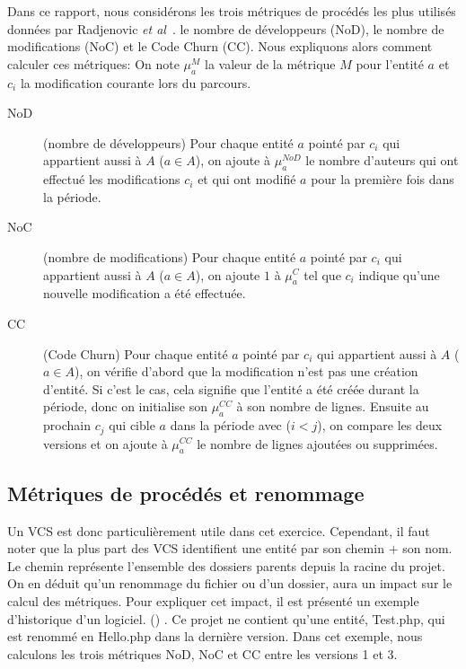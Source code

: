 Dans ce rapport, nous considérons les trois métriques de procédés les plus utilisés données par Radjenovic \emph{et al}~\cite{radjenovic_software_2013}. le nombre de développeurs (NoD), le nombre de modifications (NoC) et le Code Churn (CC). Nous expliquons alors comment calculer ces métriques:
On note $\mu_{a}^{M}$ la valeur de la métrique $M$ pour l'entité $a$ et  $c_i$ la modification courante lors du parcours. 
\begin{description}
	\item[NoD] (nombre de développeurs) Pour chaque entité $a$ pointé par $c_i$ qui appartient aussi à $A$ ($a \in A$), on ajoute à $\mu_{a}^{NoD}$ le nombre d'auteurs qui ont effectué les modifications $c_i$ et qui ont modifié $a$ pour la première fois dans la période.
	\item[NoC] (nombre de modifications) Pour chaque entité $a$ pointé par $c_i$ qui appartient aussi à $A$ ($a \in A$), on ajoute $1$ à $\mu_{a}^{C}$ tel que $c_i$ indique qu'une nouvelle modification a été effectuée.
	\item[CC] (Code Churn) Pour chaque entité $a$ pointé par $c_i$ qui appartient aussi à $A$ ($a \in A$), on vérifie d'abord que la modification n'est pas une création d'entité. Si c'est le cas, cela signifie que l'entité a été créée durant la période, donc on initialise son $\mu_{a}^{CC}$ à son nombre de lignes. Ensuite au prochain $c_j$ qui cible $a$ dans la période avec ($i < j$), on compare les deux versions et on ajoute à $\mu_{a}^{CC}$ le nombre de lignes ajoutées ou supprimées.
\end{description}


\subsection{Métriques de procédés et renommage}

Un VCS est donc particulièrement utile dans cet exercice. Cependant, il faut noter que la plus part des VCS identifient une entité par son chemin $+$ son nom. Le chemin représente l'ensemble des dossiers parents depuis la racine du projet. On en déduit qu'un renommage du fichier ou d'un dossier, aura un impact sur le calcul des métriques. Pour expliquer cet impact, il est présenté un exemple d'historique d'un logiciel. () . Ce projet ne contient qu'une entité, Test.php, qui est renommé en Hello.php dans la dernière version. Dans cet exemple, nous calculons les trois métriques NoD, NoC et CC entre les versions 1 et 3.\\

